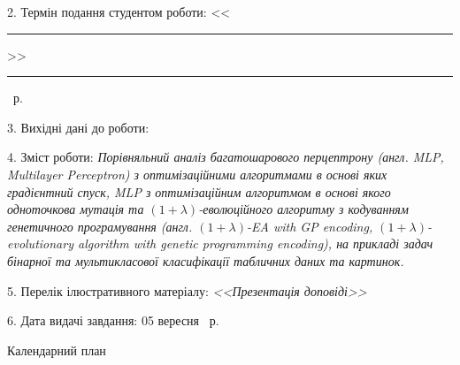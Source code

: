 2. Термін подання студентом роботи: <<\rule{0.5cm}{0.25pt}>> \rule{2.5cm}{0.25pt} \YearOfDefence~р.

3. Вихідні дані до роботи:

4. Зміст роботи: \emph{Порівняльний аналіз багатошарового перцептрону (англ. MLP, Multilayer Perceptron) з оптимізаційними алгоритмами в основі яких градієнтний спуск, MLP з оптимізаційним алгоритмом в основі якого одноточкова мутація та $(1+\lambda)$-еволюційного алгоритму з кодуванням генетичного програмування (англ. $(1+\lambda)$-EA with GP encoding, $(1+\lambda)$-evolutionary algorithm with genetic programming encoding), на прикладі задач бінарної та мультикласової класифікації табличних даних та картинок.}

5. Перелік ілюстративного матеріалу: \emph{<<Презентація доповіді>>}

6. Дата видачі завдання: 05 вересня \YearOfBeginning~р.


\begin{center}
	Календарний план
\end{center}

